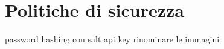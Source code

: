 \section{Politiche di sicurezza}
password hashing con salt \newline
api key \newline
rinominare le immagini